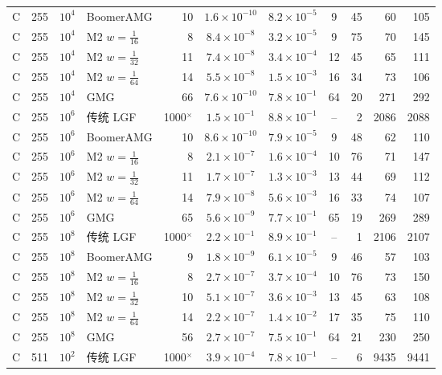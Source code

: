 \begin{longtable}{lrrlrcccrrr}
C & 255 & $10^{4}$ & BoomerAMG & 10 & $1.6{\times}10^{-10}$ & $8.2{\times}10^{-5}$ & 9 & 45 & 60 & 105 \\
C & 255 & $10^{4}$ & M2 $w{=}\frac1{16}$ & 8 & $8.4{\times}10^{-8}$ & $3.2{\times}10^{-5}$ & 9 & 75 & 70 & 145 \\
C & 255 & $10^{4}$ & M2 $w{=}\frac1{32}$ & 11 & $7.4{\times}10^{-8}$ & $3.4{\times}10^{-4}$ & 12 & 45 & 65 & 111 \\
C & 255 & $10^{4}$ & M2 $w{=}\frac1{64}$ & 14 & $5.5{\times}10^{-8}$ & $1.5{\times}10^{-3}$ & 16 & 34 & 73 & 106 \\
C & 255 & $10^{4}$ & GMG & 66 & $7.6{\times}10^{-10}$ & $7.8{\times}10^{-1}$ & 64 & 20 & 271 & 292 \\
C & 255 & $10^{6}$ & 传统 LGF & 1000$^\times$ & $1.5{\times}10^{-1}$ & $8.8{\times}10^{-1}$ & -- & 2 & 2086 & 2088 \\
C & 255 & $10^{6}$ & BoomerAMG & 10 & $8.6{\times}10^{-10}$ & $7.9{\times}10^{-5}$ & 9 & 48 & 62 & 110 \\
C & 255 & $10^{6}$ & M2 $w{=}\frac1{16}$ & 8 & $2.1{\times}10^{-7}$ & $1.6{\times}10^{-4}$ & 10 & 76 & 71 & 147 \\
C & 255 & $10^{6}$ & M2 $w{=}\frac1{32}$ & 11 & $1.7{\times}10^{-7}$ & $1.3{\times}10^{-3}$ & 13 & 44 & 69 & 112 \\
C & 255 & $10^{6}$ & M2 $w{=}\frac1{64}$ & 14 & $7.9{\times}10^{-8}$ & $5.6{\times}10^{-3}$ & 16 & 33 & 74 & 107 \\
C & 255 & $10^{6}$ & GMG & 65 & $5.6{\times}10^{-9}$ & $7.7{\times}10^{-1}$ & 65 & 19 & 269 & 289 \\
C & 255 & $10^{8}$ & 传统 LGF & 1000$^\times$ & $2.2{\times}10^{-1}$ & $8.9{\times}10^{-1}$ & -- & 1 & 2106 & 2107 \\
C & 255 & $10^{8}$ & BoomerAMG & 9 & $1.8{\times}10^{-9}$ & $6.1{\times}10^{-5}$ & 9 & 46 & 57 & 103 \\
C & 255 & $10^{8}$ & M2 $w{=}\frac1{16}$ & 8 & $2.7{\times}10^{-7}$ & $3.7{\times}10^{-4}$ & 10 & 76 & 73 & 150 \\
C & 255 & $10^{8}$ & M2 $w{=}\frac1{32}$ & 10 & $5.1{\times}10^{-7}$ & $3.6{\times}10^{-3}$ & 13 & 45 & 63 & 108 \\
C & 255 & $10^{8}$ & M2 $w{=}\frac1{64}$ & 14 & $2.2{\times}10^{-7}$ & $1.4{\times}10^{-2}$ & 17 & 35 & 75 & 110 \\
C & 255 & $10^{8}$ & GMG & 56 & $2.7{\times}10^{-7}$ & $7.5{\times}10^{-1}$ & 64 & 21 & 230 & 250 \\
C & 511 & $10^{2}$ & 传统 LGF & 1000$^\times$ & $3.9{\times}10^{-4}$ & $7.8{\times}10^{-1}$ & -- & 6 & 9435 & 9441 \\

\end{longtable}

